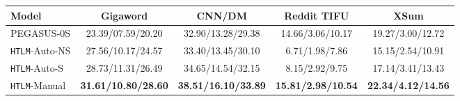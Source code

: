\documentclass[11pt,a4paper]{article}
\newcommand{\HTLM}{\texttt{HTLM}}
\begin{document}
\begin{table*}[htpb]
\centering
\begin{tabular}{@{}lcccc@{}}
\toprule
Model        & Gigaword          & CNN/DM            & Reddit TIFU      & XSum             \\ \midrule
PEGASUS-0S   & 23.39/07.59/20.20  & 32.90/13.28/29.38 & 14.66/3.06/10.17 & 19.27/3.00/12.72 \\ \midrule
\HTLM{}-Auto-NS & 27.56/10.17/24.57 & 33.40/13.45/30.10 & 6.71/1.98/7.86   & 15.15/2.54/10.91 \\
\HTLM{}-Auto-S  & 28.73/11.31/26.49 & 34.65/14.54/32.15 & 8.15/2.92/9.75   & 17.14/3.41/13.43 \\
\HTLM{}-Manual  & \bf{31.61/10.80/28.60} & \bf{38.51/16.10/33.89} & \bf{15.81/2.98/10.54} &             \bf{22.34/4.12/14.56}     \\ \bottomrule
\end{tabular}
\caption{\HTLM{} results on zero-shot summarization. \HTLM{}-Manual denotes manually engineered prompts with size hints, while \HTLM{}-Auto-S and \HTLM{}-Auto-NS indicate autoprompting with and without size hints respectively. Metrics shown are ROUGE-1/ROUGE-2/ROUGE-L respectively.}
\label{table:HTLM_summarization}
\end{table*}
\end{document}
